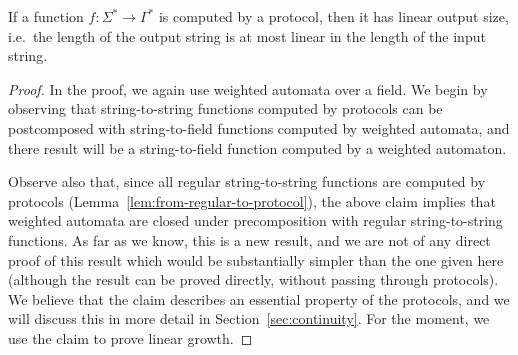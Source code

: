 \begin{lemma}\label{lem:linear-output-size}
    If a function $f : \Sigma^* \to \Gamma^*$ is computed by a protocol, then it has linear output size, i.e.~the length of the output string is at most linear in the length  of the input string.
\end{lemma}
\begin{proof}
    In the proof, we again use weighted automata over a field. We begin by observing that string-to-string functions computed by protocols can be postcomposed with string-to-field functions computed by weighted automata, and there result will be a string-to-field function computed by a weighted automaton. 



    Observe also that, since all regular string-to-string functions are computed by protocols (Lemma~\ref{lem:from-regular-to-protocol}), the above claim implies that weighted automata are closed under precomposition with regular string-to-string functions. As far as we know, this is a new result, and we are not of any direct proof of this result which would be substantially simpler than the one given here (although the result can be proved directly, without passing through protocols). 
    We believe that the  claim describes an essential property of the protocols, and we will  discuss this in more detail in Section~\ref{sec:continuity}.    For the moment, we use the claim to prove linear growth. 


\end{proof}
